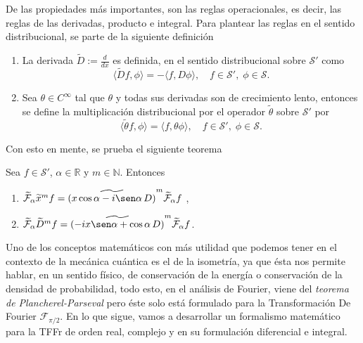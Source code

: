         De las propiedades más importantes, son las reglas operacionales, es decir, las reglas de las derivadas, producto e integral. Para plantear las reglas en el sentido distribucional, se parte de la siguiente definición

       \begin{definition*}
            \begin{enumerate}
                \item La derivada $\widetilde{D} := \frac{d}{dx}$ es definida, en el sentido distribucional sobre $\mathcal{S}'$ como
                \begin{equation}
                    \langle \widetilde{D}f,\phi \rangle = - \langle f, D \phi \rangle, \quad f \in \mathcal{S}',\; \phi \in \mathcal{S}.
                \end{equation}
                \item Sea $\theta \in C^\infty$ tal que $\theta$ y todas sus derivadas son de crecimiento lento, entonces se define la multiplicación distribucional por el operador $\tilde{\theta}$ sobre $\mathcal{S}'$ por
                \begin{equation}
                    \langle \widetilde{\theta}f, \phi \rangle = \langle f, \theta\phi \rangle, \quad f \in \mathcal{S}', \; \phi \in \mathcal{S}.
                \end{equation}
            \end{enumerate}
       \end{definition*} 

       Con esto en mente, se prueba el siguiente teorema \citep{kerr1988distributional}
       \begin{theorem*}
            Sea $f\in \mathcal{S}'$, $\alpha \in \mathbb{R}$ y $m \in \mathbb{N}$. Entonces
            \begin{enumerate}
                \item $\widetilde{\mathcal{F}}_\alpha \widetilde{x}^m f = \widetilde{\left(x\cos\alpha - i\sen\alpha\, D \right)}^m \widetilde{\mathcal{F}}_\alpha f$ ,
                \item $\widetilde{\mathcal{F}}_\alpha \widetilde{D}^m f = \widetilde{\left(-ix\sen\alpha + \cos\alpha\, D\right)}^m \widetilde{\mathcal{F}}_\alpha f$.
            \end{enumerate}
       \end{theorem*}

       Uno de los conceptos matemáticos con más utilidad que podemos tener en el contexto de la mecánica cuántica es el de la isometría, ya que ésta nos permite hablar, en un sentido físico, de conservación de la energía o conservación de la densidad de probabilidad, todo esto, en el análisis de Fourier, viene del \textit{teorema de Plancherel-Parseval} pero éste solo está formulado para la Transformación De Fourier $\mathcal{F}_{\pi/2}$. En lo que sigue, vamos a desarrollar un formalismo matemático para la TFFr de orden real, complejo y en su formulación diferencial e integral.

